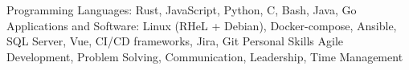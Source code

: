 
\begin{cvskills}
  \cvskill
    {Programming Languages:} %
    {Rust, JavaScript, Python, C, Bash, Java, Go} %
  \cvskill
    {Applications and Software:} %
    {Linux (RHeL + Debian), Docker-compose, Ansible, SQL Server, Vue, CI/CD frameworks, Jira, Git} %
  \cvskill
    {Personal Skills}
    {Agile Development, Problem Solving, Communication, Leadership, Time Management}
\end{cvskills}
